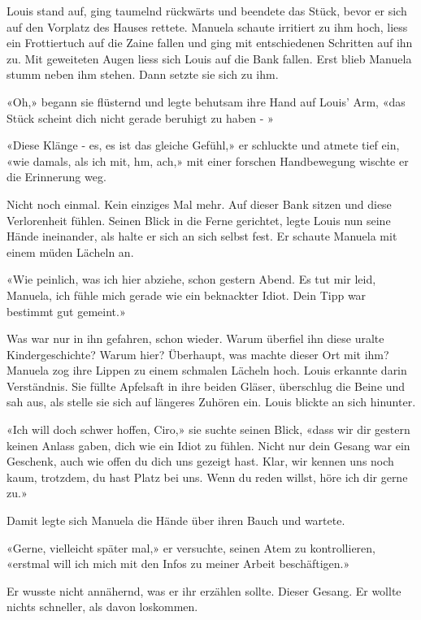 
Louis stand auf, ging taumelnd rückwärts und beendete das Stück, bevor
er sich auf den Vorplatz des Hauses rettete.
Manuela schaute irritiert zu ihm hoch, liess ein Frottiertuch auf die
Zaine fallen und ging mit entschiedenen Schritten auf ihn zu. Mit geweiteten
Augen liess sich Louis auf die Bank fallen. Erst blieb Manuela stumm neben ihm
stehen. Dann setzte sie sich zu ihm.

«Oh,» begann sie flüsternd und legte behutsam ihre Hand auf Louis’ Arm,
«das Stück scheint dich nicht gerade beruhigt zu haben - »

«Diese Klänge - es, es ist das gleiche Gefühl,» er schluckte und atmete tief ein, «wie
damals, als ich mit, hm, ach,» mit einer forschen Handbewegung wischte er
die Erinnerung weg.

Nicht noch einmal. Kein einziges Mal mehr. Auf dieser Bank sitzen und
diese Verlorenheit fühlen.
Seinen Blick in die Ferne gerichtet, legte Louis nun seine Hände
ineinander, als halte er sich an sich selbst fest. Er
schaute Manuela mit einem müden Lächeln an.

«Wie peinlich, was ich hier abziehe, schon gestern Abend. Es tut mir
leid, Manuela, ich fühle mich gerade wie ein beknackter Idiot. Dein Tipp
war bestimmt gut gemeint.»

Was war nur in ihn gefahren, schon wieder. Warum überfiel ihn diese uralte Kindergeschichte? Warum
hier? Überhaupt, was machte dieser Ort mit ihm? 
Manuela zog ihre Lippen zu einem schmalen Lächeln hoch. Louis erkannte
darin Verständnis. Sie füllte Apfelsaft in ihre beiden Gläser, überschlug die Beine und sah aus, als stelle sie sich auf längeres Zuhören ein.
Louis blickte an sich hinunter.

«Ich will doch schwer hoffen, Ciro,» sie suchte seinen Blick, «dass wir
dir gestern keinen Anlass gaben, dich wie ein Idiot zu fühlen. Nicht nur
dein Gesang war ein Geschenk, auch wie offen du dich uns gezeigt hast.
Klar, wir kennen uns noch kaum, trotzdem, du hast Platz bei uns. Wenn du
reden willst, höre ich dir gerne zu.»

Damit legte sich Manuela die Hände über ihren Bauch und wartete. 

«Gerne, vielleicht später mal,» er versuchte, seinen Atem zu
kontrollieren, «erstmal will ich mich mit den Infos zu meiner Arbeit
beschäftigen.»

Er wusste nicht annähernd, was er ihr erzählen sollte. Dieser Gesang. Er
wollte nichts schneller, als davon loskommen.

